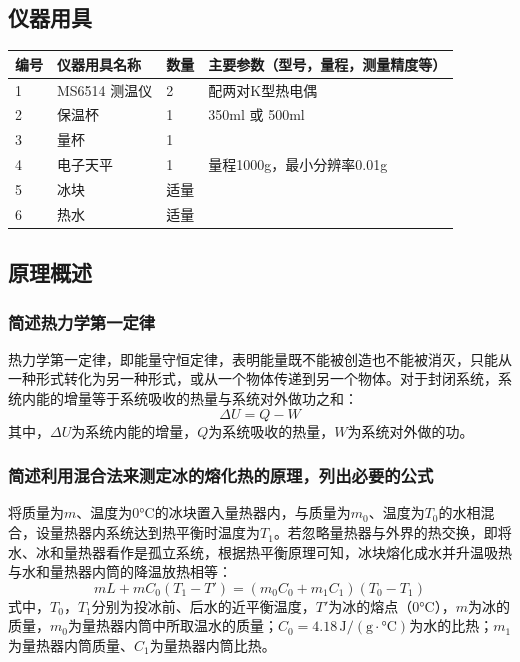 \documentclass[dvipsnames, svgnames,a4paper,11pt]{article}
\begin{document}
\subsection{仪器用具}
\begin{table}[htbp]
	\centering
	\renewcommand\arraystretch{1.6}
	\begin{tabular}{p{}|p{}|p{}|p{}}
	\hline
	编号& 仪器用具名称 & 数量 &  主要参数（型号，量程，测量精度等） \\
	\hline
	1& MS6514 测温仪 &2 & 配两对K型热电偶\\
	2& 保温杯 &1 & 350ml 或 500ml \\
	3& 量杯 &1 & \\
	4& 电子天平 &1 & 量程1000g，最小分辨率0.01g \\
	5& 冰块 & 适量 & \\
	6& 热水 & 适量 & \\
	\hline
\end{tabular}
\end{table}

\subsection{原理概述}

\subsubsection{简述热力学第一定律}

热力学第一定律，即能量守恒定律，表明能量既不能被创造也不能被消灭，只能从一种形式转化为另一种形式，或从一个物体传递到另一个物体。对于封闭系统，系统内能的增量等于系统吸收的热量与系统对外做功之和：
\begin{equation}
	\Delta U = Q - W
\end{equation}
其中，$\Delta U$为系统内能的增量，$Q$为系统吸收的热量，$W$为系统对外做的功。

\subsubsection{简述利用混合法来测定冰的熔化热的原理，列出必要的公式}


将质量为$m$、温度为$0°\mathrm{C}$的冰块置入量热器内，与质量为$m_0$、温度为$T_0$的水相混合，设量热器内系统达到热平衡时温度为$T_1$。若忽略量热器与外界的热交换，即将水、冰和量热器看作是孤立系统，根据热平衡原理可知，冰块熔化成水并升温吸热与水和量热器内筒的降温放热相等：
\begin{equation}
	mL + mC_0(T_1 - T') = (m_0C_0 + m_1C_1)(T_0 - T_1)
\end{equation}
式中，$T_0$，$T_1$分别为投冰前、后水的近平衡温度，$T'$为冰的熔点（$0°\mathrm{C}$），$m$为冰的质量，$m_0$为量热器内筒中所取温水的质量；$C_0 = 4.18\,\mathrm{J/(g\cdot°C)}$为水的比热；$m_1$为量热器内筒质量、$C_1$为量热器内筒比热。
\end{document}
